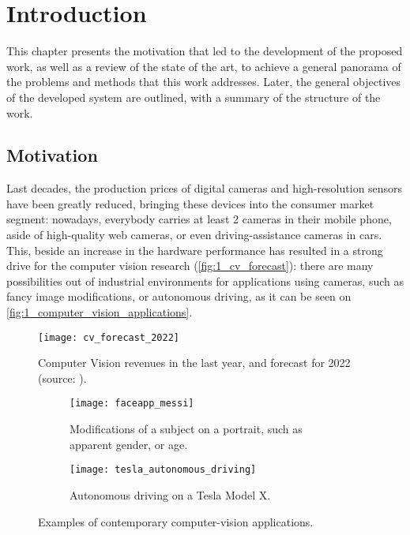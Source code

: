 \chapter{Introduction}
\label{chap:1_introduction}
This chapter presents the motivation that led to the development of the proposed work, as well as a review of the state of the art, to achieve a general panorama of the problems and methods that this work addresses. Later, the general objectives of the developed system are outlined, with a summary of the structure of the work.


\section{Motivation}
	
Last decades, the production prices of digital cameras and high-resolution sensors have been greatly reduced, bringing these devices into the consumer market segment: nowadays, everybody carries at least 2 cameras in their mobile phone, aside of high-quality web cameras, or even driving-assistance cameras in cars. This, beside an increase in the hardware performance has resulted in a strong drive for the computer vision research (\autoref{fig:1_cv_forecast}): there are many possibilities out of industrial environments for applications using cameras, such as fancy image modifications, or autonomous driving, as it can be seen on \autoref{fig:1_computer_vision_applications}.

\begin{figure}[h]
	\centering
	\texttt{[image: cv\_forecast\_2022]}
	\caption{Computer Vision revenues in the last year, and forecast for 2022 (source: \cite{cv_forecast}).}
	\label{fig:1_cv_forecast}
\end{figure}


\begin{figure}[h]
	\centering
	\begin{subfigure}[t]{0.45\linewidth}
		\centering
		\texttt{[image: faceapp\_messi]}
		\caption{Modifications of a subject on a portrait, such as apparent gender, or age.}
	\end{subfigure}
	\begin{subfigure}[t]{0.45\linewidth}
		\centering
		\texttt{[image: tesla\_autonomous\_driving]}
		\caption{Autonomous driving on a Tesla Model X.}
	\end{subfigure}
	\caption{Examples of contemporary computer-vision applications.}
	\label{fig:1_computer_vision_applications}
\end{figure}

